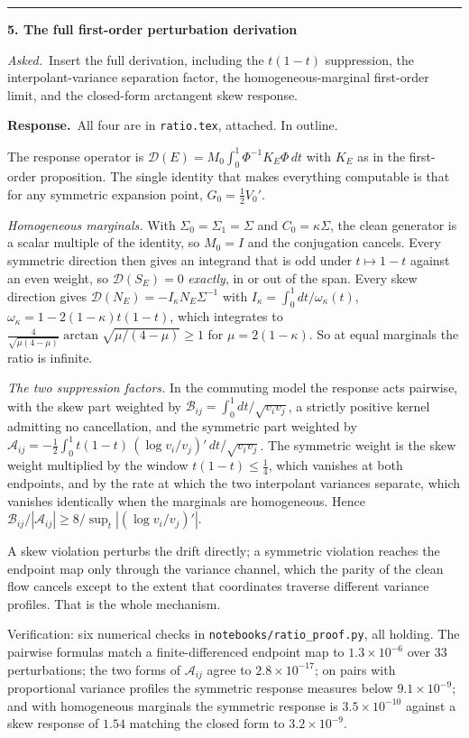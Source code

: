 \documentclass[11pt]{article}
\newenvironment{item12}[1]{%
  \par\medskip\noindent\rule{\textwidth}{0.7pt}\par\nobreak\smallskip
  \noindent\textbf{\large #1}\par\nobreak\smallskip
}{\par\medskip}
\newcommand{\ask}[1]{\noindent\emph{Asked.}\ #1\par\smallskip}
\newcommand{\resp}{\noindent\textbf{Response.}\ }
\begin{document}
\begin{item12}{5. The full first-order perturbation derivation}
\ask{Insert the full derivation, including the $t(1-t)$ suppression, the interpolant-variance
separation factor, the homogeneous-marginal first-order limit, and the closed-form arctangent
skew response.}

\resp All four are in \texttt{ratio.tex}, attached. In outline.

The response operator is $\mathcal D(E)=M_0\int_0^1\Phi^{-1}K_E\Phi\,dt$ with $K_E$ as in the
first-order proposition. The single identity that makes everything computable is that for any
symmetric expansion point, $G_0=\tfrac12 V_0'$.

\emph{Homogeneous marginals.} With $\Sigma_0=\Sigma_1=\Sigma$ and $C_0=\kappa\Sigma$, the clean
generator is a scalar multiple of the identity, so $M_0=I$ and the conjugation cancels. Every
symmetric direction then gives an integrand that is odd under $t\mapsto1-t$ against an even
weight, so $\mathcal D(S_E)=0$ \emph{exactly}, in or out of the span. Every skew direction gives
$\mathcal D(N_E)=-I_\kappa N_E\Sigma^{-1}$ with
$I_\kappa=\int_0^1 dt/\omega_\kappa(t)$, $\omega_\kappa=1-2(1-\kappa)t(1-t)$, which integrates to
$\tfrac{4}{\sqrt{\mu(4-\mu)}}\arctan\sqrt{\mu/(4-\mu)}\ge1$ for $\mu=2(1-\kappa)$. So at equal
marginals the ratio is infinite.

\emph{The two suppression factors.} In the commuting model the response acts pairwise, with the
skew part weighted by $\mathcal B_{ij}=\int_0^1 dt/\sqrt{v_iv_j}$, a strictly positive kernel
admitting no cancellation, and the symmetric part weighted by
$\mathcal A_{ij}=-\tfrac12\int_0^1 t(1-t)\,(\log v_i/v_j)'\,dt/\sqrt{v_iv_j}$. The symmetric
weight is the skew weight multiplied by the window $t(1-t)\le\tfrac14$, which vanishes at both
endpoints, and by the rate at which the two interpolant variances separate, which vanishes
identically when the marginals are homogeneous. Hence
$\mathcal B_{ij}/|\mathcal A_{ij}|\ge 8/\sup_t|(\log v_i/v_j)'|$.

A skew violation perturbs the drift directly; a symmetric violation reaches the endpoint map only
through the variance channel, which the parity of the clean flow cancels except to the extent
that coordinates traverse different variance profiles. That is the whole mechanism.

Verification: six numerical checks in \texttt{notebooks/ratio\_proof.py}, all holding. The
pairwise formulas match a finite-differenced endpoint map to $1.3\times10^{-6}$ over $33$
perturbations; the two forms of $\mathcal A_{ij}$ agree to $2.8\times10^{-17}$; on pairs with
proportional variance profiles the symmetric response measures below $9.1\times10^{-9}$; and with
homogeneous marginals the symmetric response is $3.5\times10^{-10}$ against a skew response of
$1.54$ matching the closed form to $3.2\times10^{-9}$.
\end{item12}
\end{document}
